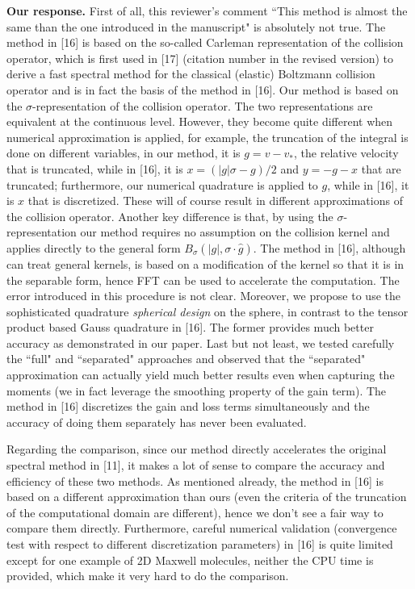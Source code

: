\documentclass[11pt]{article}
\begin{document}
{\bf Our response.} First of all, this reviewer's comment ``This method is almost the same than the one introduced in the manuscript" is absolutely not true. The method in [16] is based on the so-called Carleman representation of the collision operator, which is first used in [17] (citation number in the revised version) to derive a fast spectral method for the classical (elastic) Boltzmann collision operator and is in fact the basis of the method in [16]. Our method is based on the $\sigma$-representation of the collision operator. The two representations are equivalent at the continuous level. However, they become quite different when numerical approximation is applied, for example, the truncation of the integral is done on different variables, in our method, it is $g=v-v_*$, the relative velocity that is truncated, while in [16], it is $x=(|g|\sigma-g)/2$ and $y=-g-x$ that are truncated; furthermore, our numerical quadrature is applied to $g$, while in [16], it is $x$ that is discretized. These will of course result in different approximations of the collision operator. Another key difference is that, by using the $\sigma$-representation our method requires no assumption on the collision kernel and applies directly to the general form $B_{\sigma}(|g|,\sigma\cdot \hat{g})$. The method in [16], although can treat general kernels, is based on a modification of the kernel so that it is in the separable form, hence FFT can be used to accelerate the computation. The error introduced in this procedure is not clear. Moreover, we propose to use the sophisticated quadrature {\it spherical design} on the sphere, in contrast to the tensor product based Gauss quadrature in [16]. The former provides much better accuracy as demonstrated in our paper. Last but not least, we tested carefully the ``full" and ``separated" approaches and observed that the ``separated" approximation can actually yield much better results even when capturing the moments (we in fact leverage the smoothing property of the gain term). The method in [16] discretizes the gain and loss terms simultaneously and the accuracy of doing them separately has never been evaluated.

Regarding the comparison, since our method directly accelerates the original spectral method in [11], it makes a lot of sense to compare the accuracy and efficiency of these two methods. As mentioned already, the method in [16] is based on a different approximation than ours (even the criteria of the truncation of the computational domain are different), hence we don't see a fair way to compare them directly. Furthermore, careful numerical validation (convergence test with respect to different discretization parameters) in [16] is quite limited except for one example of 2D Maxwell molecules, neither the CPU time is provided, which make it very hard to do the comparison.  
\end{document}
